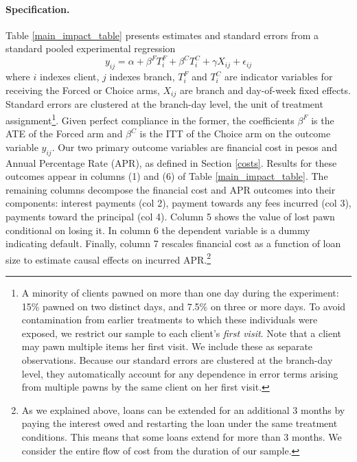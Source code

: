 \documentclass[oneside,11pt]{article}
\begin{document}
\paragraph{Specification.} Table \ref{main_impact_table} presents estimates and standard errors from a standard pooled experimental regression 
\begin{equation} \label{basic_reg}
    y_{ij} = \alpha + \beta^F T_{i}^F + \beta^C T_{i}^C + \gamma X_{ij} + \epsilon_{ij}
\end{equation}
where $i$ indexes client, $j$ indexes branch, $T_{i}^F$ and $T_{i}^C$ are indicator variables for receiving the Forced or Choice arms, $X_{ij}$ are branch and day-of-week fixed effects. Standard errors are clustered at the branch-day level, the unit of treatment assignment\footnote{A minority of clients pawned on more than one day during the experiment: 15\% pawned on two distinct days, and 7.5\% on three or more days. To avoid contamination from earlier treatments to which these individuals were exposed, we restrict our sample to each client's \emph{first visit}. Note that a client may pawn multiple items her first visit. We include these as separate observations. Because our standard errors are clustered at the branch-day level, they automatically account for any dependence in error terms arising from multiple pawns by the same client on her first visit.}.
Given perfect compliance in the former, the coefficients $\beta^F$ is the ATE of the Forced arm and $\beta^C$ is the ITT of the Choice arm on the outcome variable $y_{ij}$.
Our two primary outcome variables are financial cost in pesos and Annual Percentage Rate (APR), as defined in Section \ref{costs}. 
Results for these outcomes appear in columns (1) and (6) of Table \ref{main_impact_table}.
The remaining columns decompose the financial cost and APR outcomes into their components: interest payments (col 2), payment towards any fees incurred (col 3), payments toward the principal (col 4). Column 5 shows the value of lost pawn conditional on losing it.  In column 6 the dependent variable is a dummy indicating default.  Finally, column 7 rescales financial cost as a function of loan size to estimate causal effects on incurred APR.\footnote{As we explained above, loans can be extended for an additional 3 months by paying the interest owed and restarting the loan under the same treatment conditions. This means that some loans extend for more than 3 months. We consider the entire flow of cost from the duration of our sample.}  
\end{document}
